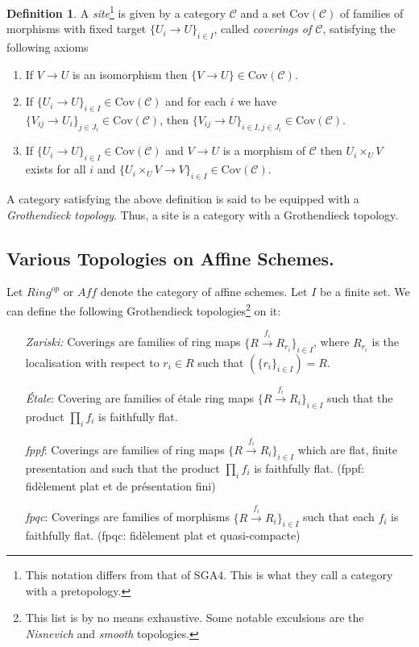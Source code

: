 \documentclass[11pt]{amsart}
\theoremstyle{definition}
\newtheorem{definition}[theorem]{Definition}
\begin{document}
\begin{definition}
	\label{definition-site}
	A {\it site}\footnote{This notation differs from that of SGA4. This is what they call a category with a pretopology.} is given by a category $\mathcal{C}$ and a set
	$\text{Cov}(\mathcal{C})$ of families of morphisms with fixed target
	$\{U_i \to U\}_{i \in I}$, called {\it coverings of $\mathcal{C}$},
	satisfying the following axioms
	\begin{enumerate}
		\item If $V \to U$ is an isomorphism then $\{V \to U\} \in
		\text{Cov}(\mathcal{C})$.
		\item If $\{U_i \to U\}_{i\in I} \in \text{Cov}(\mathcal{C})$ and for each
		$i$ we have $\{V_{ij} \to U_i\}_{j\in J_i} \in \text{Cov}(\mathcal{C})$, then
		$\{V_{ij} \to U\}_{i \in I, j\in J_i} \in \text{Cov}(\mathcal{C})$.
		\item If $\{U_i \to U\}_{i\in I}\in \text{Cov}(\mathcal{C})$
		and $V \to U$ is a morphism of $\mathcal{C}$ then $U_i \times_U V$
		exists for all $i$ and
		$\{U_i \times_U V \to V \}_{i\in I} \in \text{Cov}(\mathcal{C})$.
	\end{enumerate}
\end{definition}

A category  satisfying the above definition is said to be equipped with a \textit{Grothendieck topology}. Thus, a site is a category with a Grothendieck topology.

\subsection{Various Topologies on Affine Schemes.} Let $\mathit{Ring}^{op}$ or $\mathit{Aff}$ denote the category of affine schemes. Let $I$ be a finite set. We can define the following Grothendieck topologies\footnote{This list is by no means exhaustive. Some notable exculsions are the \textit{Nisnevich} and \textit{smooth} topologies.} on it:

\begin{enumerate}
	\item[\textit{Zariski:}]  Coverings are families of ring maps $\{ R \overset{f_i}{\to} R_{r_i}\}_{i \in I}$, where $R_{r_i}$ is the localisation with respect to $r_i\in R$ such that $(\{r_i\}_{i\in I})= R$.
	\item[\textit{\'{E}tale}:] Covering are families of \'{e}tale ring maps $\{ R \overset{f_i}{\to} R_i\}_{i \in I}$ such that the product $\prod_i f_i$ is faithfully flat.
	\item[\textit{fppf}:] Coverings are families of ring maps $\{ R \overset{f_i}{\to} R_i\}_{i \in I}$ which are flat, finite presentation and such that the product $\prod_i f_i$ is faithfully flat. (fppf: fid\`{e}lement plat et de pr\'{e}sentation fini)
	\item[\textit{fpqc}:] Coverings are families of morphisms $\{ R \overset{f_i}{\to} R_i\}_{i \in I}$ such that each $f_i$ is faithfully flat. (fpqc: fid\`{e}lement plat et quasi-compacte)
\end{enumerate}
\text
\end{document}
